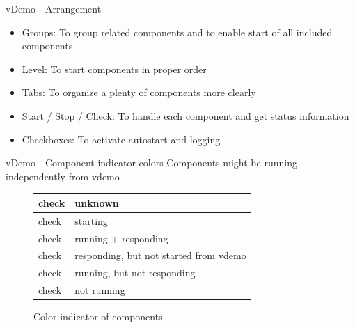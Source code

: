 \begin{frame}[fragile]{vDemo - Arrangement}
	\begin{itemize}
		\item \alert{Groups}: To group related components and to enable start of all included components
	\item \alert{Level}: To start components in proper order 
	\item \alert{Tabs}: To organize a plenty of components more clearly
	\item \alert{Start / Stop / Check}: To handle each component and get status information
	\item \alert{Checkboxes}: To activate autostart and logging
	\end{itemize}
\end{frame}

\begin{frame}[fragile]{vDemo - Component indicator colors}
	\alert{Components might be running independently from vdemo} %
	\begin{center}
		
		\begin{figure}
			
			
			\begin{tabular}{|l|l|}
				\hline
				\cellcolor{gray!50}check & unknown \\
				\hline
				\cellcolor{yellow}check & starting \\
				\hline
				\cellcolor{green}check & running + responding \\
				\hline
				\cellcolor{orange}check & responding, but not started from vdemo \\
				\hline
				\cellcolor{pink}check & running, but not responding \\
				\hline
				\cellcolor{red}check & not running \\
				\hline
			\end{tabular}
			\caption{Color indicator of components}
		\end{figure}
	\end{center}
\end{frame}

